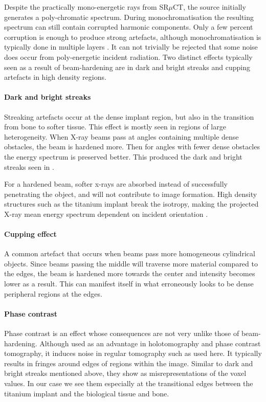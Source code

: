 Despite the practically mono-energetic rays from SR$\mu$CT, the source initially generates a
poly-chromatic spectrum. During monochromatisation the resulting spectrum can still contain
corrupted harmonic components. Only a few percent corruption is enough to produce strong artefacts,
although monochromatisation is typically done in multiple layers \citep{srnoise}.  It can not
trivially be rejected that some noise does occur from poly-energetic incident radiation.  Two
distinct effects typically seen as a result of beam-hardening are in dark and bright streaks and
cupping artefacts in high density regions.

\paragraph{Dark and bright streaks} Streaking artefacts occur at the dense implant region, but also
in the transition from bone to softer tissue. This effect is mostly seen in regions of large
heterogeneity. When X-ray beams pass at angles containing multiple dense obstacles, the beam is
hardened more. Then for angles with fewer dense obstacles the energy spectrum is preserved better.
This produced the dark and bright streaks seen in .

For a hardened beam, softer x-rays are absorbed instead of successfully penetrating the object, and
will not contribute to image formation. High density structures such as the titanium implant break
the isotropy, making the projected X-ray mean energy spectrum dependent on incident orientation
\citep{srnoise}.

\paragraph{Cupping effect} A common artefact that occurs when beams pass more homogeneous
cylindrical objects. Since beams passing the middle will traverse more material compared to the
edges, the beam is hardened more towards the center and intensity becomes lower as a result. This
can manifest itself in what erroneously looks to be dense peripheral regions at the edges.

\paragraph{Phase contrast} Phase contrast is an effect whose consequences are not very unlike those
of beam-hardening.  Although used as an advantage in holotomography\citep{holotomography} and phase
contrast tomography\citep{phasecontrast}, it induces noise in regular tomography such as used here.
It typically results in fringes around edges of regions within the image\citep{srnoise}. Similar to
dark and bright streaks mentioned above, they show as misrepresentations of the voxel values. In our
case we see them especially at the transitional edges between the titanium implant and the
biological tissue and bone.

